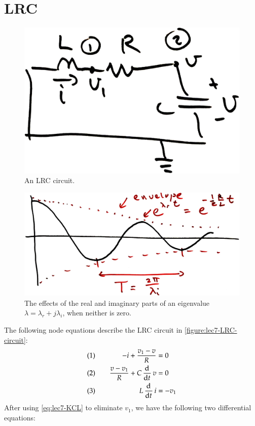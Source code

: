 \section{LRC}
\begin{figure}
  \centering
  \includegraphics[width=0.5\linewidth]{figures/7/LRC-circuit}
  \caption{An LRC circuit.}
  \label{figure:lec7-LRC-circuit}
\end{figure}
\begin{figure}
  \centering
  \includegraphics[width=0.8\linewidth]{figures/7/decaying-exponential}
  \caption{The effects of the real and imaginary parts of an eigenvalue \(\lambda = \lambda_r + j\lambda_i\), when neither is zero.}
  \label{figure:lec7-decaying-exponential}
\end{figure}
The following node equations describe the LRC circuit in \autoref{figure:lec7-LRC-circuit}:
\begin{alignat}{3}
  & (1) \quad & -i + \frac{v_1 - v}{R} & = 0\label{eq:lec7-KCL}\\
  & (2) \quad & \frac{v - v_1}{R} + C \dod{}{t} v &= 0\\
  & (3) \quad & L \dod{}{t}i &= -v_1
\end{alignat}
After using \autoref{eq:lec7-KCL} to eliminate \(v_1\), we have the following two differential equations:
